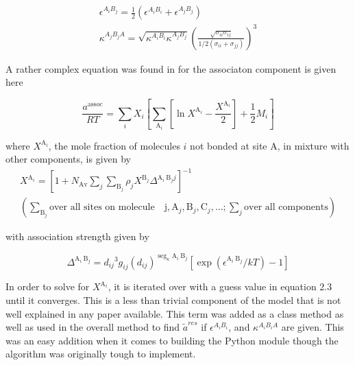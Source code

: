 \documentclass[12pt, letterpaper]{article}
\begin{document}
\begin{equation}
\begin{gathered}
\epsilon^{A_i B_j}=\frac{1}{2}\left(\epsilon^{A_i B_i}+\epsilon^{A_j B_j}\right) \\
\kappa^{A_j B_j A}=\sqrt{\kappa^{A_i B_i} \kappa^{A_j B_j}}\left(\frac{\sqrt{\sigma_{i i} \sigma_{i j}}}{1 / 2\left(\sigma_{i i}+\sigma_{j j}\right)}\right)^3
\end{gathered}
\end{equation}

A rather complex equation was found in \cite{Huang1991-xk} for the associaton component is given here

\begin{equation}
\frac{a^{\mathrm{ass} o c}}{R T}=\sum_i X_i\left[\sum_{\mathrm{A}_i}\left[\ln X^{\mathrm{A}_i}-\frac{X^{\mathrm{A}_i}}{2}\right]+\frac{1}{2} M_i\right]
\end{equation}

where $X^{\mathrm{A}_{\mathrm{i}}}$, the mole fraction of molecules $i$ not bonded at site $\mathrm{A}$, in mixture with other components, is given by
\begin{equation}
\begin{gathered}
X^{\mathrm{A}_i}=\left[1+N_{\mathrm{Av}} \sum_j \sum_{\mathrm{B}_j} \rho_j X^{\mathrm{B}_j} \Delta^{\mathrm{A}_i \mathrm{~B}_j j}\right]^{-1} \\
\left(\sum_{\mathrm{B}_j} \text{over all sites on molecule} \quad \mathrm{j}, \mathrm{A}_j, \mathrm{B}_j, \mathrm{C}_j, \ldots ; \sum_j \text{over all components} \right)
\end{gathered}
\end{equation}

with association strength given by

\begin{equation}
\Delta^{\mathrm{A}_i \mathrm{~B}_j}=d_{i j}{ }^3 g_{i j}\left(d_{i j}\right)^{\operatorname{seg}_\kappa \mathrm{A}_i \mathrm{~B}_j}\left[\exp \left(\epsilon^{\mathrm{A}_i \mathrm{~B}_j} / k T\right)-1\right]
\end{equation}

In order to solve for $X^{\mathrm{A}_i}$, it is iterated over with a guess value in equation 2.3 until it converges. This is a less than trivial component of the model that is not well explained in any paper available. This term was added as a class method as well as used in the overall method to find $\tilde{a}^{res}$ if $\epsilon^{A_iB_i}$, and $\kappa^{A_{i}B_{i}A}$ are given. This was an easy addition when it comes to building the Python module though the algorithm was originally tough to implement.
\end{document}
